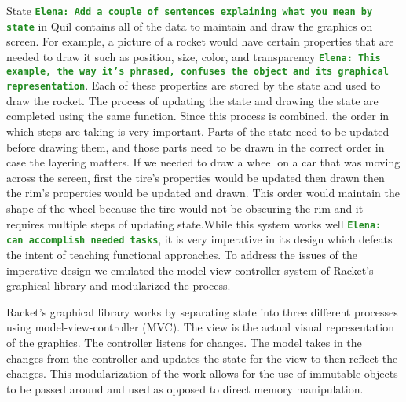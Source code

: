 \documentclass[12pt]{article}
\newcommand{\comment}[1]{{\bf \tt  {#1}}}
\newcommand{\emcomment}[1]{\textcolor{ForestGreen}{\comment{Elena: {#1}}}}
\begin{document}
State \emcomment{Add a couple of sentences explaining what you mean by state} in Quil contains all of the data to maintain and draw the graphics on screen. For example, a picture of a rocket would have certain properties that are needed to draw it such as position, size, color, and transparency \emcomment{This example, the way it's phrased, confuses the object and its graphical representation}. Each of these properties are stored by the state and used to draw the rocket. The process of updating the state and drawing the state are completed using the same function. Since this process is combined, the order in which steps are taking is very important. Parts of the state need to be updated before drawing them, and those parts need to be drawn in the correct order in case the layering matters. If we needed to draw a wheel on a car that was moving across the screen, first the tire's properties would be updated then drawn then the rim's properties would be updated and drawn. This order would maintain the shape of the wheel because the tire would not be obscuring the rim and it requires multiple steps of updating state.While this system works well \emcomment{can accomplish needed tasks}, it is very imperative in its design which defeats the intent of teaching functional approaches. To address the issues of the imperative design we emulated the model-view-controller system of Racket's graphical library and modularized the process. 

Racket's graphical library works by separating state into three different processes using model-view-controller (MVC). The view is the actual visual representation of the graphics. The controller listens for changes. The model takes in the changes from the controller and updates the state for the view to then reflect the changes. This modularization of the work allows for the use of immutable objects to be passed around and used as opposed to direct memory manipulation.
\end{document}

